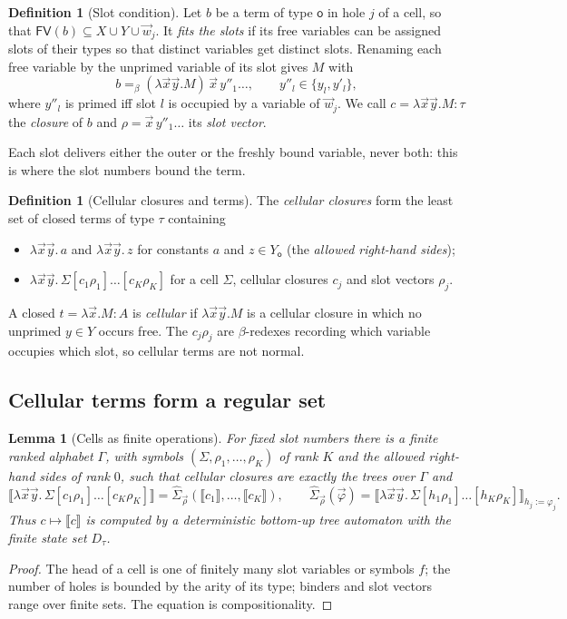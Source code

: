 \documentclass[11pt]{article}
\newcommand{\Ground}{\mathsf{o}\xspace}
\newcommand{\FV}{\mathsf{FV}\xspace}
\newcommand{\mcell}{\Sigma}
\newcommand{\sem}[1]{\llbracket #1\rrbracket}
\newtheorem{lemma}[theorem]{Lemma}
\theoremstyle{definition}
\newtheorem{definition}[theorem]{Definition}
\begin{document}
\begin{definition}[Slot condition]
Let $b$ be a term of type $\Ground$ in hole $j$ of a cell, so that
$\FV(b)\subseteq X\cup Y\cup\vec w_j$.  It \emph{fits the slots} if its
free variables can be assigned slots of their types so that distinct
variables get distinct slots.  Renaming each free variable by the
unprimed variable of its slot gives $M$ with
\[
   b =_\beta (\lambda\vec x\vec y.M)\,\vec x\,y''_1\ldots,
   \qquad y''_l\in\{y_l,y'_l\},
\]
where $y''_l$ is primed iff slot $l$ is occupied by a variable of
$\vec w_j$.  We call $c=\lambda\vec x\vec y.M:\tau$ the \emph{closure} of
$b$ and $\rho=\vec x\,y''_1\ldots$ its \emph{slot vector}.
\end{definition}

Each slot delivers either the outer or the freshly bound variable, never
both: this is where the slot numbers bound the term.

\begin{definition}[Cellular closures and terms]\label{def:cellular}
The \emph{cellular closures} form the least set of closed terms of type
$\tau$ containing
\begin{itemize}
\item $\lambda\vec x\vec y.\,a$ and $\lambda\vec x\vec y.\,z$ for constants
  $a$ and $z\in Y_\Ground$ (the \emph{allowed right-hand sides});
\item $\lambda\vec x\vec y.\,\mcell[c_1\rho_1]\ldots[c_K\rho_K]$ for a cell
  $\mcell$, cellular closures $c_j$ and slot vectors $\rho_j$.
\end{itemize}
A closed $t=\lambda\vec x.M:A$ is \emph{cellular} if $\lambda\vec x\vec y.M$
is a cellular closure in which no unprimed $y\in Y$ occurs free.  The
$c_j\rho_j$ are $\beta$-redexes recording which variable occupies which
slot, so cellular terms are not normal.
\end{definition}

\subsection{Cellular terms form a regular set}

\begin{lemma}[Cells as finite operations]\label{lem:automaton}
For fixed slot numbers there is a finite ranked alphabet $\Gamma$, with
symbols $(\mcell,\rho_1,\ldots,\rho_K)$ of rank $K$ and the allowed
right-hand sides of rank $0$, such that cellular closures are exactly the
trees over $\Gamma$ and
\[
  \sem{\lambda\vec x\vec y.\,\mcell[c_1\rho_1]\ldots[c_K\rho_K]}
  =\hat\mcell_{\vec\rho}(\sem{c_1},\ldots,\sem{c_K}),
  \qquad
  \hat\mcell_{\vec\rho}(\vec\varphi)
  =\sem{\lambda\vec x\vec y.\,\mcell[h_1\rho_1]\ldots[h_K\rho_K]}_{h_j:=\varphi_j}.
\]
Thus $c\mapsto\sem c$ is computed by a deterministic bottom-up tree
automaton with the finite state set $D_\tau$.
\end{lemma}
\begin{proof}
The head of a cell is one of finitely many slot variables or symbols $f$;
the number of holes is bounded by the arity of its type; binders and slot
vectors range over finite sets.  The equation is compositionality.
\end{proof}
\end{document}
